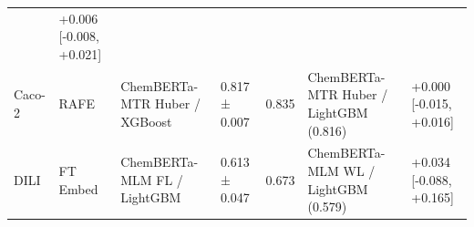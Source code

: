 \documentclass[
  10pt,
]{article}
\begin{document}
\begin{longtable}[]{@{}lllllll@{}}
\begin{minipage}[t]{0.12\columnwidth}
\end{minipage} & \begin{minipage}[t]{0.12\columnwidth}\raggedright
+0.006 {[}-0.008, +0.021{]}\strut
\end{minipage}\tabularnewline
\begin{minipage}[t]{0.12\columnwidth}\raggedright
Caco-2\strut
\end{minipage} & \begin{minipage}[t]{0.12\columnwidth}\raggedright
RAFE\strut
\end{minipage} & \begin{minipage}[t]{0.12\columnwidth}\raggedright
ChemBERTa-MTR Huber / XGBoost\strut
\end{minipage} & \begin{minipage}[t]{0.12\columnwidth}\raggedright
0.817 ± 0.007\strut
\end{minipage} & \begin{minipage}[t]{0.12\columnwidth}\raggedright
0.835\strut
\end{minipage} & \begin{minipage}[t]{0.12\columnwidth}\raggedright
ChemBERTa-MTR Huber / LightGBM (0.816)\strut
\end{minipage} & \begin{minipage}[t]{0.12\columnwidth}\raggedright
+0.000 {[}-0.015, +0.016{]}\strut
\end{minipage}\tabularnewline
\begin{minipage}[t]{0.12\columnwidth}\raggedright
DILI\strut
\end{minipage} & \begin{minipage}[t]{0.12\columnwidth}\raggedright
FT Embed\strut
\end{minipage} & \begin{minipage}[t]{0.12\columnwidth}\raggedright
ChemBERTa-MLM FL / LightGBM\strut
\end{minipage} & \begin{minipage}[t]{0.12\columnwidth}\raggedright
0.613 ± 0.047\strut
\end{minipage} & \begin{minipage}[t]{0.12\columnwidth}\raggedright
0.673\strut
\end{minipage} & \begin{minipage}[t]{0.12\columnwidth}\raggedright
ChemBERTa-MLM WL / LightGBM (0.579)\strut
\end{minipage} & \begin{minipage}[t]{0.12\columnwidth}\raggedright
+0.034 {[}-0.088, +0.165{]}\strut

\end{minipage}
\end{longtable}
\end{document}
